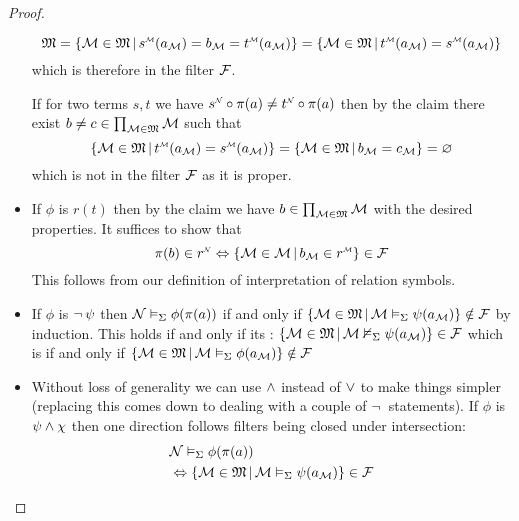 \begin{proof}
\begin{itemize}
\begin{forward}
            \[  
                \f{M} = 
                \set{\MM \in \f{M} \st 
                \modintp{\MM}{s}(a_\MM) = b_\MM = \modintp{\MM}{t}(a_\MM)} 
                = 
                \set{\MM \in \f{M} \st 
                    \modintp{\MM}{t}(a_\MM) = \modintp{\MM}{s}(a_\MM)} 
            \]
            which is therefore in the filter $\mathcal{F}$.
        \end{forward}
        \begin{backward}
            If for two terms $s,t$ we have
            $\modintp{\NN}{s}\circ \pi(a) \ne \modintp{\NN}{t}\circ \pi(a)$
            then by the claim there exist 
            $b \ne c \in \prod_{\mathcal{M} \in \mathfrak{M}} \mathcal{M}$ such that
            \[  
                \set{\MM \in \f{M} \st 
                    \modintp{\MM}{t}(a_\MM) = \modintp{\MM}{s}(a_\MM)} =
                \set{\MM \in \f{M} \st b_\MM = c_\MM} = 
                \nothing
            \]
            which is not in the filter $\mathcal{F}$ as it is proper.
        \end{backward}
        \item If $\phi$ is $r(t)$ then by the claim we have 
            $b \in \prod_{\mathcal{M} \in \mathfrak{M}} \mathcal{M}$ with the desired properties.
            It suffices to show that 
            \[\pi(b) \in \nnintp{r} \iff 
            \set{\MM \in \f{\MM} \st b_\MM \in \mmintp{r}} \in \FF\]
            This follows from our definition of 
            interpretation of relation symbols.
        \item If $\phi$ is $\neg\, \psi$ then 
            $\mathcal{N} \vDash_{\Sigma} \phi(\pi(a))$ if and only if 
            $\left\{\mathcal{M} \in \mathfrak{M} \,|\, \mathcal{M} \vDash_{\Sigma} \psi(a_{\mathcal{M}})\right\} \notin \mathcal{F}$
            by induction.
            This holds if and only if its 
            :
            $\left\{\mathcal{M} \in \mathfrak{M} \,|\, \mathcal{M} \nvDash_{\Sigma} \psi(a_{\mathcal{M}})\right\} \in \mathcal{F}$
            which is if and only if 
            $\left\{\mathcal{M} \in \mathfrak{M} \,|\, \mathcal{M} \vDash_{\Sigma} \phi(a_{\mathcal{M}})\right\} \notin \mathcal{F}$
        \item Without loss of generality we can use $\land$ instead of $\lor$
            to make things simpler 
            (replacing this comes down to dealing with a couple of $\neg\,$
            statements).
            If $\phi$ is $\psi \land \chi$ then one direction 
            follows filters being closed under intersection:
            \begin{align*}
                &\NN \model{\Si} \phi(\pi(a))\\
                &\iff 
                \set{\MM \in \f{M} \st \MM \model{\Si} \psi(a_\MM)} \in \FF

\end{align*}
\end{itemize}
\end{proof}
